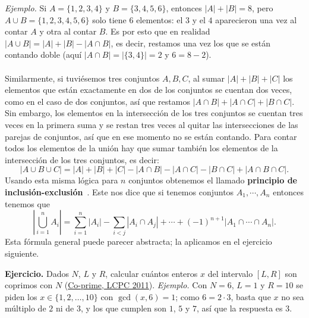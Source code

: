\textit{Ejemplo.} Si $A=\{1,2,3,4\}$ y $B=\{3,4,5,6\}$, entonces $|A|+|B|=8$, pero $A\cup B=\{1,2,3,4,5,6\}$ solo tiene $6$ elementos: el $3$ y el $4$ aparecieron una vez al contar $A$ y otra al contar $B$. Es por esto que en realidad $|A \cup B|=|A| + |B| - |A \cap B|$, es decir, restamos una vez los que se están contando doble (aquí $|A\cap B|=|\{3,4\}|=2$ y $6=8-2$).
\\\\Similarmente, si tuviésemos tres conjuntos $A,B,C$, al sumar $|A|+|B|+|C|$ los elementos que están exactamente en dos de los conjuntos se cuentan dos veces, como en el caso de dos conjuntos, así que restamos $|A\cap B|+|A\cap C|+|B\cap C|$. Sin embargo, los elementos en la intersección de los tres conjuntos se cuentan tres veces en la primera suma y se restan tres veces al quitar las intersecciones de las parejas de conjuntos, así que en ese momento no se están contando. Para contar todos los elementos de la unión hay que sumar también los elementos de la intersección de los tres conjuntos, es decir:
\[
|A \cup B \cup C|=|A|+|B|+|C|-|A \cap B|-|A \cap C|-|B \cap C|+|A \cap B \cap C|.
\]
Usando esta misma lógica para $n$ conjuntos obtenemos el llamado \textbf{principio de inclusión-\hspace{0pt}exclusión}~\cite{cf_incexc}. Este nos dice que si tenemos conjuntos $A_1,\cdots, A_n$ entonces tenemos que
\[
|\bigcup_{i=1}^{n}A_i|=\sum_{i=1}^{n}|A_i|-\sum_{i<j}|A_i \cap A_j|+\cdots+(-1)^{n+1}|A_1\cap \cdots \cap A_n|.
\]
Esta fórmula general puede parecer abstracta; la aplicamos en el ejercicio siguiente.

\textbf{Ejercicio.} Dados $N$, $L$ y $R$, calcular cuántos enteros $x$ del intervalo $[L,R]$ son coprimos con $N$ (\href{https://acm.hdu.edu.cn/showproblem.php?pid=4135}{Co-prime, LCPC 2011}). \textit{Ejemplo.} Con $N=6$, $L=1$ y $R=10$ se piden los $x\in\{1,2,\ldots,10\}$ con $\gcd(x,6)=1$; como $6=2\cdot 3$, basta que $x$ no sea múltiplo de $2$ ni de $3$, y los que cumplen son $1$, $5$ y $7$, así que la respuesta es $3$.

